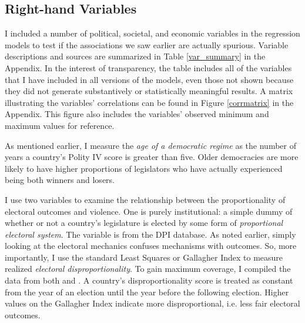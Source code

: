 \documentclass[a4paper]{article}\usepackage{graphicx, color}
\begin{document}
\subsection{Right-hand Variables}

I included a number of political, societal, and economic variables in the regression models to test if the associations we saw earlier are actually spurious. Variable descriptions and sources are summarized in Table \ref{var_summary} in the Appendix. In the interest of transparency, the table includes all of the variables that I have included in all versions of the models, even those not shown because they did not generate substantively or statistically meaningful results. A matrix illustrating the variables' correlations can be found in Figure \ref{corrmatrix} in the Appendix. This figure also includes the variables' observed minimum and maximum values for reference. 

As mentioned earlier, I measure the {\emph{age of a democratic regime}} as the number of years a country's Polity IV score is greater than five. Older democracies are more likely to have higher proportions of legislators who have actually experienced being both winners and losers. 

I use two variables to examine the relationship between the proportionality of electoral outcomes and violence. One is purely institutional: a simple dummy of whether or not a country's legislature is elected by some form of {\emph{proportional electoral system}}. The variable is from the DPI database. As noted earlier, simply looking at the electoral mechanics confuses mechanisms with outcomes. So, more importantly, I use the standard Least Squares or Gallagher Index \citep{Gallagher1991} to measure realized {\emph{electoral disproportionality}}. To gain maximum coverage, I compiled the data from both \cite{Gallagher2012} and \cite{Carey2011}. A country's disproportionality score is treated as constant from the year of an election until the year before the following election. Higher values on the Gallagher Index indicate more disproportional, i.e. less fair electoral outcomes. 
\end{document}
